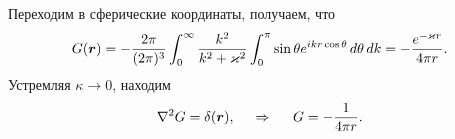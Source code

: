 Переходим в сферические координаты, получаем, что
\begin{equation*}
    G(\mbox{\boldmath $r$}) = - \frac{2 \pi}{(2 \pi)^3} \int_{0}^{\infty} \frac{k^2}{k^2 + \varkappa^2} \int_{0}^{\pi} 
    \sin \theta  e^{i k r \cos \theta}  \, d \theta \, d k = 
    - \frac{e^{- \varkappa r}}{4 \pi r}
    .
\end{equation*}
Устремляя $\kappa \to 0$, находим
\begin{equation*}
     \nabla^2 G = \delta(\mbox{\boldmath $r$}),
     \hspace{0.5cm} \Rightarrow \hspace{0.5cm}
     G = - \frac{1}{4 \pi r}.
 \end{equation*} 





